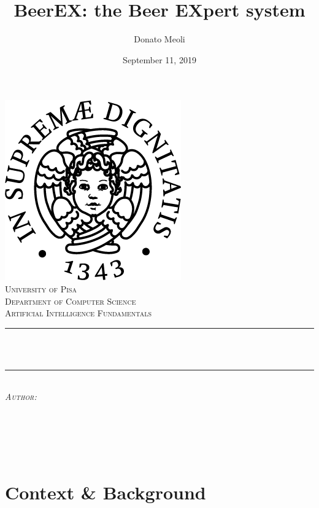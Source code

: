 \documentclass[12pt]{article}
\title{BeerEX: the Beer EXpert system}
\author{Donato Meoli}
\date{September 11, 2019}
\makeatletter
\let\thetitle\@title
\let\theauthor\@author
\let\thedate\@date
\makeatother
\begin{document}
\begin{titlepage}
	\centering
    \vspace*{0.5 cm}
    \includegraphics[scale = 0.5]{img/unipi.png}\\[1.0 cm]
    \textsc{\LARGE University of Pisa}\\[0.5 cm]
    \textsc{\Large Department of Computer Science}\\[1.5 cm]
	\textsc{\large Artificial Intelligence Fundamentals}\\[0.5 cm]
	\rule{\linewidth}{0.2 mm} \\[0.4 cm]
	{ \huge \bfseries \thetitle}\\
	\rule{\linewidth}{0.2 mm} \\[1.5 cm]
	\centering \textsc{\large \emph{Author:}}\\[0.5 cm]
	\begin{minipage}{0.4\textwidth}
		\begin{center} \large
			\textbf{\theauthor}
		\end{center}
		\end{minipage}~
		\begin{minipage}{0.4\textwidth}
	\end{minipage}\\[2 cm]
	{\large \thedate}\\[2 cm]
	\vfill
\end{titlepage}

\tableofcontents
\pagebreak

\section{Context \& Background}
\end{document}
